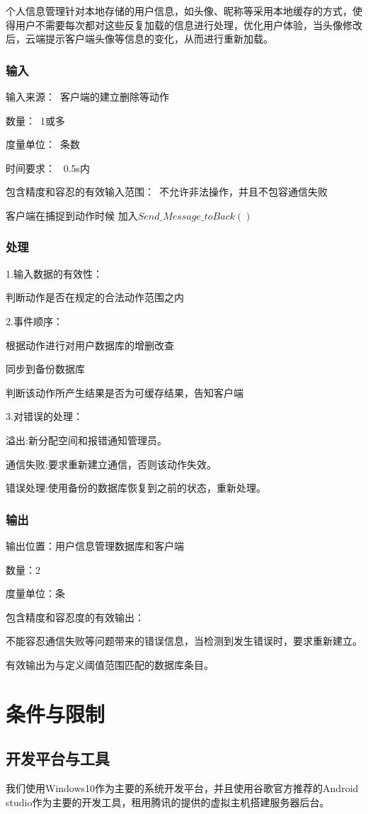 个人信息管理针对本地存储的用户信息，如头像、昵称等采用本地缓存的方式，使得用户不需要每次都对这些反复加载的信息进行处理，优化用户体验，当头像修改后，云端提示客户端头像等信息的变化，从而进行重新加载。
\subsubsection{输入}
输入来源：\ 客户端的建立删除等动作

数量：\ 1或多

度量单位：\ 条数

时间要求： \ 0.5s内

包含精度和容忍的有效输入范围：\ 不允许非法操作，并且不包容通信失败

客户端在捕捉到动作时候 加入$Send\_Message\_toBack()$
\subsubsection{处理}

1.输入数据的有效性：

判断动作是否在规定的合法动作范围之内

2.事件顺序：

根据动作进行对用户数据库的增删改查

同步到备份数据库

判断该动作所产生结果是否为可缓存结果，告知客户端

3.对错误的处理：

溢出:新分配空间和报错通知管理员。

通信失败:要求重新建立通信，否则该动作失效。

错误处理:使用备份的数据库恢复到之前的状态，重新处理。

\subsubsection{输出}
输出位置：用户信息管理数据库和客户端

数量：2

度量单位：条

包含精度和容忍度的有效输出：

不能容忍通信失败等问题带来的错误信息，当检测到发生错误时，要求重新建立。

有效输出为与定义阈值范围匹配的数据库条目。

\section{条件与限制}
\subsection{开发平台与工具}
我们使用Windows10作为主要的系统开发平台，并且使用谷歌官方推荐的Android studio作为主要的开发工具，租用腾讯的提供的虚拟主机搭建服务器后台。

